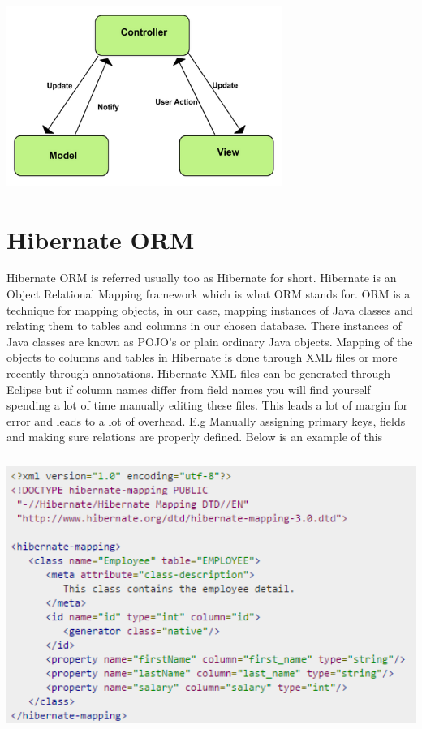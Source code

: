 \begin{center}    
   	\includegraphics[height=6cm, width=9cm]{img/mvc.png}
\end{center}

\section{Hibernate ORM}

Hibernate ORM\cite{Hibernate} is referred usually too as Hibernate for short. Hibernate is an Object Relational Mapping framework which is what ORM stands for. ORM is a technique for mapping objects, in our case, mapping instances of Java classes and relating them to tables and columns in our chosen database. There instances of Java classes are known as POJO's or plain ordinary Java objects. Mapping of the objects to columns and tables in Hibernate is done through XML\cite{HibernateXML}\cite{XML} files or more recently through annotations\cite{HibernateAnnotations}. Hibernate XML files can be generated through Eclipse but if column names differ from field names you will find yourself spending a lot of time manually editing these files. This leads a lot of margin for error and leads to a lot of overhead. E.g Manually assigning primary keys, fields and making sure relations are properly defined. 
\noindent \newline \newline Below is an example of this 

\begin{center}    
	\includegraphics[height=9cm, width=14cm]{img/hibernatemapping.png}
\end{center}

